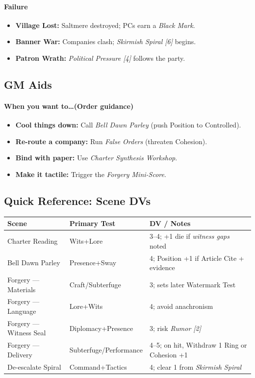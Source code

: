 \documentclass[11pt]{article}
\begin{document}
\paragraph{Failure}
\begin{itemize}[leftmargin=*]
  \item \textbf{Village Lost:} Saltmere destroyed; PCs earn a \emph{Black Mark}.
  \item \textbf{Banner War:} Companies clash; \emph{Skirmish Spiral [6]} begins.
  \item \textbf{Patron Wrath:} \emph{Political Pressure [4]} follows the party.
\end{itemize}

\subsection*{GM Aids}
\paragraph{When you want to\dots (Order guidance)}
\begin{itemize}[leftmargin=*]
  \item \textbf{Cool things down:} Call \emph{Bell Dawn Parley} (push Position to Controlled).
  \item \textbf{Re-route a company:} Run \emph{False Orders} (threaten Cohesion).
  \item \textbf{Bind with paper:} Use \emph{Charter Synthesis Workshop}.
  \item \textbf{Make it tactile:} Trigger the \emph{Forgery Mini-Score}.
\end{itemize}

\subsection*{Quick Reference: Scene DVs}
\begin{center}\small
\begin{longtable}{lll}
\toprule
\textbf{Scene} & \textbf{Primary Test} & \textbf{DV / Notes} \\
\midrule
Charter Reading & Wits+Lore & 3--4; +1 die if \emph{witness gaps} noted \\
Bell Dawn Parley & Presence+Sway & 4; Position +1 if Article Cite + evidence \\
Forgery --- Materials & Craft/Subterfuge & 3; sets later Watermark Test \\
Forgery --- Language & Lore+Wits & 4; avoid anachronism \\
Forgery --- Witness Seal & Diplomacy+Presence & 3; risk \emph{Rumor [2]} \\
Forgery --- Delivery & Subterfuge/Performance & 4--5; on hit, Withdraw 1 Ring or Cohesion +1 \\
De-escalate Spiral & Command+Tactics & 4; clear 1 from \emph{Skirmish Spiral} \\
\bottomrule
\end{longtable}
\end{center}
\end{document}
